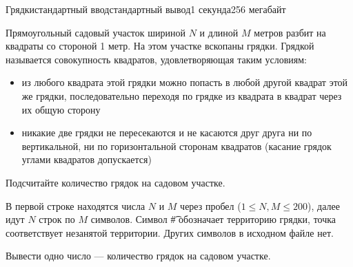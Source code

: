 \begin{problem}{Грядки}{стандартный ввод}{стандартный вывод}{1 секунда}{256 мегабайт}

Прямоугольный садовый участок шириной $N$ и длиной $M$ метров разбит на квадраты со стороной 1 метр. На этом участке вскопаны грядки. Грядкой называется совокупность квадратов, удовлетворяющая таким условиям:

\begin{itemize}
\item из любого квадрата этой грядки можно попасть в любой другой квадрат этой же грядки, последовательно переходя по грядке из квадрата в квадрат через их общую сторону
\item никакие две грядки не пересекаются и не касаются друг друга ни по вертикальной, ни по горизонтальной сторонам квадратов (касание грядок углами квадратов допускается)
\end{itemize}

Подсчитайте количество грядок на садовом участке.

\InputFile
В первой строке находятся числа $N$ и $M$ через пробел ($1 \le N, M \le 200$), далее идут $N$ строк по $M$ символов. Символ \t{\#} обозначает территорию грядки, точка соответствует незанятой территории. Других символов в исходном файле нет.

\OutputFile
Вывести одно число --- количество грядок на садовом участке.

\Example

\begin{example}
%
\end{example}

\end{problem}

